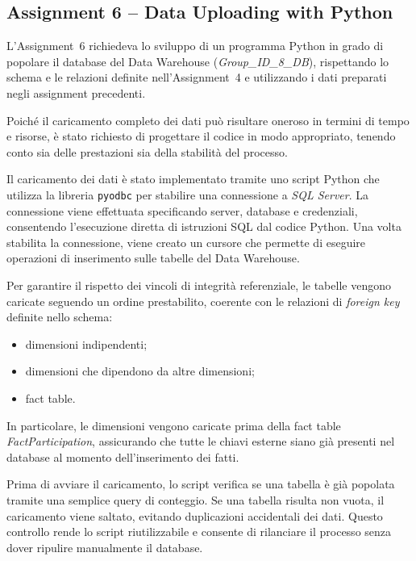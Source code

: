\subsection*{Assignment 6 -- Data Uploading with Python}

L’Assignment~6 richiedeva lo sviluppo di un programma Python in grado di
popolare il database del Data Warehouse (\textit{Group\_ID\_8\_DB}),
rispettando lo schema e le relazioni definite nell’Assignment~4 e utilizzando
i dati preparati negli assignment precedenti.

Poiché il caricamento completo dei dati può risultare oneroso in termini di
tempo e risorse, è stato richiesto di progettare il codice in modo appropriato,
tenendo conto sia delle prestazioni sia della stabilità del processo.

Il caricamento dei dati è stato implementato tramite uno script Python che
utilizza la libreria \texttt{pyodbc} per stabilire una connessione a
\textit{SQL Server}. La connessione viene effettuata specificando server,
database e credenziali, consentendo l’esecuzione diretta di istruzioni SQL
dal codice Python. Una volta stabilita la connessione, viene creato un cursore
che permette di eseguire operazioni di inserimento sulle tabelle del
Data Warehouse.

Per garantire il rispetto dei vincoli di integrità referenziale, le tabelle
vengono caricate seguendo un ordine prestabilito, coerente con le relazioni
di \textit{foreign key} definite nello schema:
\begin{itemize}
    \item dimensioni indipendenti;
    \item dimensioni che dipendono da altre dimensioni;
    \item fact table.
\end{itemize}

In particolare, le dimensioni vengono caricate prima della fact table
\textit{FactParticipation}, assicurando che tutte le chiavi esterne siano già
presenti nel database al momento dell’inserimento dei fatti.

Prima di avviare il caricamento, lo script verifica se una tabella è già
popolata tramite una semplice query di conteggio. Se una tabella risulta non
vuota, il caricamento viene saltato, evitando duplicazioni accidentali dei
dati. Questo controllo rende lo script riutilizzabile e consente di rilanciare
il processo senza dover ripulire manualmente il database.

